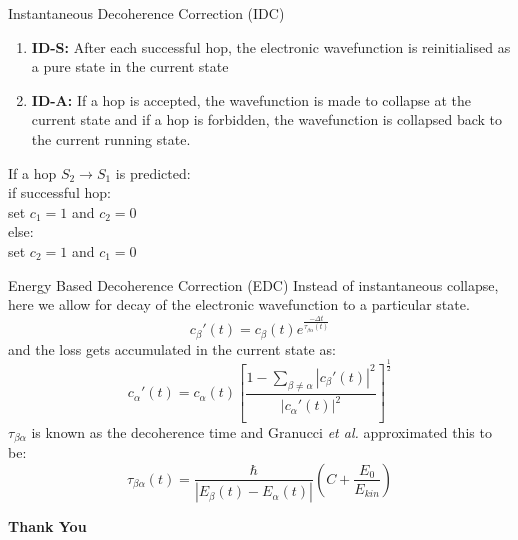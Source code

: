 \documentclass{beamer}
\begin{document}
    \begin{frame}[t]{Instantaneous Decoherence Correction (IDC)}
	\begin{enumerate}
	\item{\textbf{ID-S:} After each successful hop, the electronic wavefunction is reinitialised as a pure state in the current state}
	\item{\textbf{ID-A:} If a hop is accepted, the wavefunction is made to collapse at the current state and if a hop is forbidden, the wavefunction is collapsed back to the current running state.}
	\end{enumerate}
	If a hop $S_2 \rightarrow S_1$ is predicted:\\
	\hspace{2cm} if successful hop:\\
	\hspace{4cm} set $c_1 = 1$ and $c_2 = 0$\\
	\hspace{2cm} else:\\
	\hspace{4cm} set $c_2 = 1$ and $c_1 = 0$\\
	\end{frame}
	
	\begin{frame}[t]{Energy Based Decoherence Correction (EDC)}
	Instead of instantaneous collapse, here we allow for decay of the electronic wavefunction to a particular state.
	\begin{equation}\label{eq:16}
	c_\beta'(t) = c_\beta(t)e^{\frac{-\Delta t}{\tau_{\beta\alpha}(t)}}
    \end{equation}
    and the loss gets accumulated in the current state as:
    \begin{equation}\label{eq:17}
    c_\alpha'(t) = c_\alpha(t)\left[\frac{1-\sum_{\beta\neq\alpha}|c_\beta'(t)|^2}{|c_\alpha'(t)|^2}\right]^{\frac{1}{2}}
    \end{equation}    	 
    $\tau_{\beta\alpha}$ is known as the decoherence time and Granucci \textit{et al.} approximated this to be:
    \begin{equation}\label{eq:19}
    \tau_{\beta\alpha}(t) = \frac{\hbar}{|E_\beta(t)-E_\alpha(t)|}\left(C+\frac{E_0}{E_{kin}}\right)
    \end{equation}
	\end{frame}  
	
	\begin{frame}
	\huge{\textbf{Thank You}}
    \end{frame}	  	
	
\end{document}
